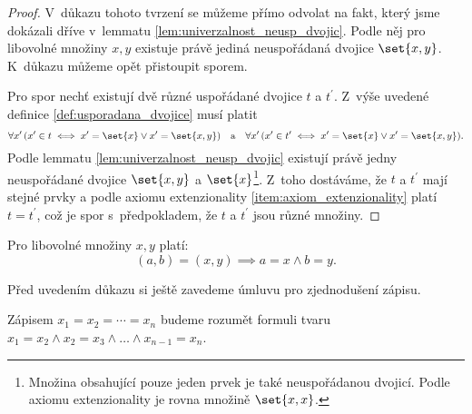 \begin{proof}
    V~důkazu tohoto tvrzení se můžeme přímo odvolat na fakt, který jsme dokázali dříve v~lemmatu \ref{lem:univerzalnost_neusp_dvojic}. Podle něj pro libovolné množiny $x,y$ existuje právě jediná neuspořádaná dvojice $\set{x,y}$. K~důkazu můžeme opět přistoupit sporem.\par
    Pro spor nechť existují dvě různé uspořádané dvojice $t$ a $t^\prime$. Z~výše uvedené definice \ref{def:usporadana_dvojice} musí platit
    \begin{equation*}
        \forall x^\prime\,(x^\prime\in t \iff x^\prime=\set{x} \lor x^\prime=\set{x,y})\quad\text{a}\quad \forall x^\prime\,(x^\prime\in t^\prime \iff x^\prime=\set{x} \lor x^\prime=\set{x,y}).
    \end{equation*}
    Podle lemmatu \ref{lem:univerzalnost_neusp_dvojic} existují právě jedny neuspořádané dvojice $\set{x,y}$ a $\set{x}$\footnote{Množina obsahující pouze jeden prvek je také neuspořádanou dvojicí. Podle axiomu extenzionality je rovna množině $\set{x,x}$.}. Z~toho dostáváme, že $t$ a $t^\prime$ mají stejné prvky a podle axiomu extenzionality \ref{item:axiom_extenzionality} platí $t=t^\prime$, což je spor s~předpokladem, že $t$ a $t^\prime$ jsou různé množiny.
\end{proof}
\begin{lemma}\label{lem:vlastnost_usp_dvojic}
    Pro libovolné množiny $x,y$ platí:
    \begin{equation*}
        (a,b)=(x,y) \implies a=x \land b=y.
    \end{equation*}
\end{lemma}
Před uvedením důkazu si ještě zavedeme úmluvu pro zjednodušení zápisu.
\begin{convention}
    Zápisem $x_1=x_2=\cdots=x_n$ budeme rozumět formuli tvaru $x_1=x_2 \land x_2=x_3 \land \dots \land x_{n-1}=x_n$.
\end{convention}
